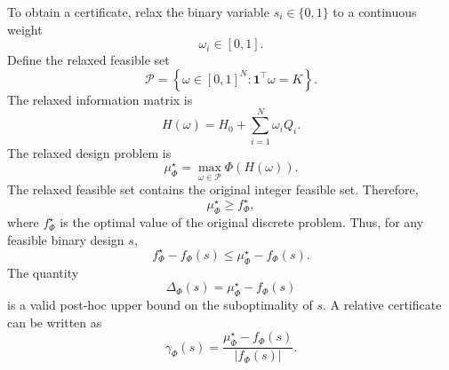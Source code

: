 \documentclass[letterpaper, 9
 pt, conference]{ieeeconf}
\begin{document}
To obtain a certificate, relax the binary variable $s_i\in\{0,1\}$ to a continuous weight
\begin{equation}
    \omega_i\in[0,1].
\end{equation}
Define the relaxed feasible set
\begin{equation}
    \mathcal{P}
    =
    \left\{
    \omega\in[0,1]^N:
    \mathbf{1}^{\top}\omega=K
    \right\}.
\end{equation}
The relaxed information matrix is
\begin{equation}
    H(\omega)
    =
    H_0+\sum_{i=1}^{N}\omega_iQ_i.
\end{equation}
The relaxed design problem is
\begin{equation}
    \mu_\Phi^\star
    =
    \max_{\omega\in\mathcal{P}}
    \Phi(H(\omega)).
\end{equation}
The relaxed feasible set contains the original integer feasible set. Therefore,
\begin{equation}
    \mu_\Phi^\star
    \geq
    f_\Phi^\star,
\end{equation}
where $f_\Phi^\star$ is the optimal value of the original discrete problem. Thus, for any feasible binary design $s$,
\begin{equation}
    f_\Phi^\star-f_\Phi(s)
    \leq
    \mu_\Phi^\star-f_\Phi(s).
\end{equation}
The quantity
\begin{equation}
    \Delta_\Phi(s)
    =
    \mu_\Phi^\star-f_\Phi(s)
\end{equation}
is a valid post-hoc upper bound on the suboptimality of $s$. A relative certificate can be written as
\begin{equation}
    \gamma_\Phi(s)
    =
    \frac{
    \mu_\Phi^\star-f_\Phi(s)
    }{
    |f_\Phi(s)|
    }.
\end{equation}
\end{document}
